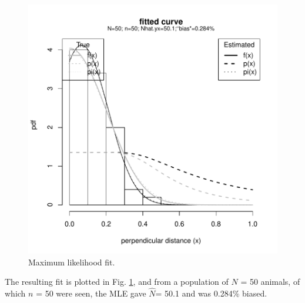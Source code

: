\documentclass{article}
\begin{document}
\begin{figure}
\begin{centering}
\includegraphics{simulations-plotMLE}
\caption{Maximum likelihood fit.} \label{fig:mleFit}
\end{centering}
\end{figure}
The resulting fit is plotted in Fig. \ref{fig:mleFit}, and from a population of $N$ = 50 animals, of which $n$ = 50 were seen, the MLE gave $\hat{N}$= 50.1 and was 0.284\% biased.
\end{document}
